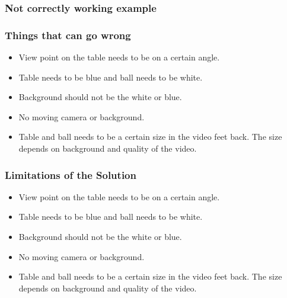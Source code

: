 \documentclass{beamer}
\begin{document}
\begin{frame}
	\frametitle{Not correctly working example}
		
	\begin{center}
	\end{center}
	
\end{frame}

\begin{frame}
	\frametitle{Things that can go wrong}
	\begin{itemize}
		\item View point on the table needs to be on a certain angle.
		\item Table needs to be blue and ball needs to be white. 
		\item Background should not be the white or blue.
		\item No moving camera or background.
		\item Table and ball needs to be a certain size in the video feet back. The size depends on background and quality of the video.
	\end{itemize}
\end{frame}

\begin{frame}
	\frametitle{Limitations of the Solution}
	\begin{itemize}
		\item View point on the table needs to be on a certain angle.
		\item Table needs to be blue and ball needs to be white. 
		\item Background should not be the white or blue.
		\item No moving camera or background.
		\item Table and ball needs to be a certain size in the video feet back. The size depends on background and quality of the video.
	\end{itemize}
\end{frame}
\end{document}
